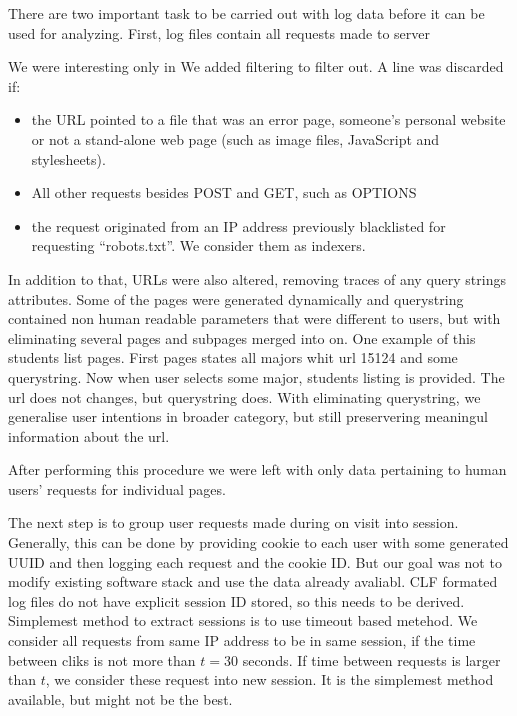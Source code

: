 \documentclass[english,a4paper]{article}
\begin{document}
There are two important task to be carried out with log data before it can be used for analyzing. First, log files contain all requests made to server




We were interesting only in 
We added filtering to filter out. A line was discarded if:

\begin{itemize}
\item the URL pointed to a file that was an error page, someone's personal website or not a stand-alone web page (such as image files, JavaScript and stylesheets).
\item All other requests besides POST and GET, such as OPTIONS
\item the request originated from an IP address previously blacklisted for requesting {}``robots.txt''. We consider them as indexers.
\end{itemize}

In addition to that, URLs were also altered, removing traces of any query strings attributes. Some of the pages were generated dynamically and querystring contained  non human readable parameters that were different to users, but with eliminating several pages and subpages merged into on. One example of this students list pages. First pages states all majors whit url 15124 and some querystring. Now when user selects some major,  students listing is provided. The url does not changes, but querystring does. With eliminating querystring, we generalise user intentions in broader category, but still preservering meaningul information about the url.



After performing this procedure we were left with only data pertaining to human users' requests for individual pages. 

The next step is to group user requests made during on visit into session. Generally, this can be done by providing cookie to each user with some generated UUID and then logging each request and the cookie ID. But our goal was not to modify existing software stack and use the data already avaliabl. CLF formated log files do not have explicit session ID stored, so this needs to be derived. 
Simplemest method to extract sessions is to use timeout based metehod. We consider all requests from same IP address to be in same session, if the time between cliks is not more than $t=30$ seconds. If time between requests is larger than $t$, we consider these request into new session. 
It is the simplemest method available, but might not be the best. 
\end{document}

